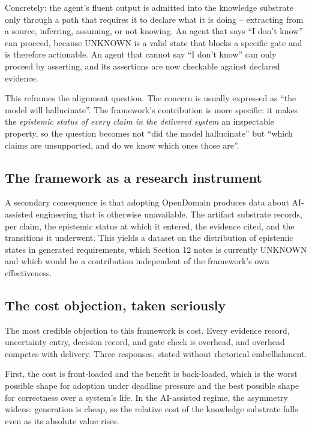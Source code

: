 \documentclass[11pt,a4paper]{article}
\begin{document}
Concretely: the agent's fluent output is admitted into the knowledge substrate only through a path that requires it to declare what it is doing -- extracting from a source, inferring, assuming, or not knowing. An agent that says ``I don't know'' can proceed, because UNKNOWN is a valid state that blocks a specific gate and is therefore actionable. An agent that cannot say ``I don't know'' can only proceed by asserting, and its assertions are now checkable against declared evidence.

This reframes the alignment question. The concern is usually expressed as ``the model will hallucinate''. The framework's contribution is more specific: it makes the \emph{epistemic status of every claim in the delivered system} an inspectable property, so the question becomes not ``did the model hallucinate'' but ``which claims are unsupported, and do we know which ones those are''.

\subsection{The framework as a research instrument}

A secondary consequence is that adopting OpenDomain produces data about AI-assisted engineering that is otherwise unavailable. The artifact substrate records, per claim, the epistemic status at which it entered, the evidence cited, and the transitions it underwent. This yields a dataset on the distribution of epistemic states in generated requirements, which Section 12 notes is currently UNKNOWN and which would be a contribution independent of the framework's own effectiveness.

\subsection{The cost objection, taken seriously}

The most credible objection to this framework is cost. Every evidence record, uncertainty entry, decision record, and gate check is overhead, and overhead competes with delivery. Three responses, stated without rhetorical embellishment.

First, the cost is front-loaded and the benefit is back-loaded, which is the worst possible shape for adoption under deadline pressure and the best possible shape for correctness over a system's life. In the AI-assisted regime, the asymmetry widens: generation is cheap, so the relative cost of the knowledge substrate falls even as its absolute value rises.
\end{document}
